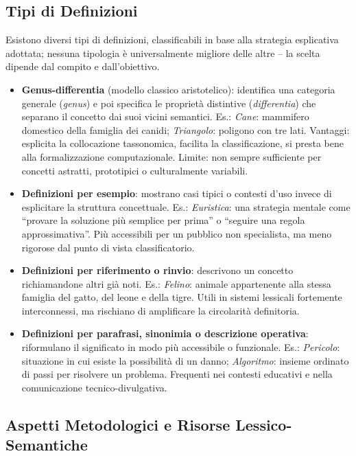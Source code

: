 \documentclass[12pt,a4paper]{article}
\begin{document}
\subsection{Tipi di Definizioni}

Esistono diversi tipi di definizioni, classificabili in base alla strategia esplicativa adottata; nessuna tipologia \`e universalmente migliore delle altre -- la scelta dipende dal compito e dall'obiettivo.

\begin{itemize}
  \item \textbf{Genus-differentia} (modello classico aristotelico): identifica una categoria generale (\emph{genus}) e poi specifica le propriet\`a distintive (\emph{differentia}) che separano il concetto dai suoi vicini semantici. Es.: \textit{Cane}: mammifero domestico della famiglia dei canidi; \textit{Triangolo}: poligono con tre lati. Vantaggi: esplicita la collocazione tassonomica, facilita la classificazione, si presta bene alla formalizzazione computazionale. Limite: non sempre sufficiente per concetti astratti, prototipici o culturalmente variabili.
  \item \textbf{Definizioni per esempio}: mostrano casi tipici o contesti d'uso invece di esplicitare la struttura concettuale. Es.: \textit{Euristica}: una strategia mentale come ``provare la soluzione pi\`u semplice per prima'' o ``seguire una regola approssimativa''. Pi\`u accessibili per un pubblico non specialista, ma meno rigorose dal punto di vista classificatorio.
  \item \textbf{Definizioni per riferimento o rinvio}: descrivono un concetto richiamandone altri gi\`a noti. Es.: \textit{Felino}: animale appartenente alla stessa famiglia del gatto, del leone e della tigre. Utili in sistemi lessicali fortemente interconnessi, ma rischiano di amplificare la circolarit\`a definitoria.
  \item \textbf{Definizioni per parafrasi, sinonimia o descrizione operativa}: riformulano il significato in modo pi\`u accessibile o funzionale. Es.: \textit{Pericolo}: situazione in cui esiste la possibilit\`a di un danno; \textit{Algoritmo}: insieme ordinato di passi per risolvere un problema. Frequenti nei contesti educativi e nella comunicazione tecnico-divulgativa.
\end{itemize}

\subsection{Aspetti Metodologici e Risorse Lessico-Semantiche}
\end{document}
